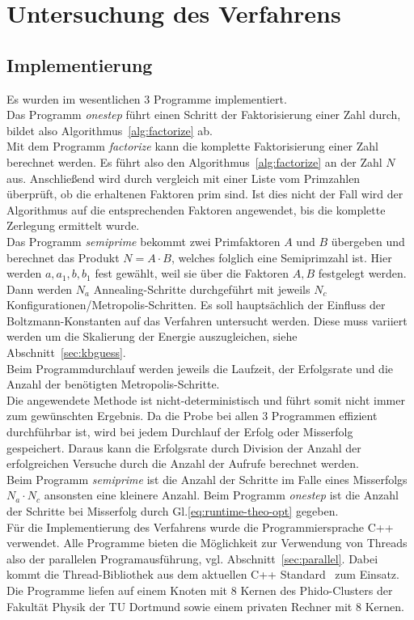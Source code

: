 \chapter{Untersuchung des Verfahrens}

\section{Implementierung}
Es wurden im wesentlichen $3$ Programme implementiert.  \\
Das Programm \textit{onestep} führt einen Schritt der Faktorisierung einer Zahl durch, bildet also Algorithmus~\ref{alg:factorize} ab. \\
Mit dem Programm \textit{factorize} kann die komplette Faktorisierung einer Zahl berechnet werden. Es führt also den Algorithmus~\ref{alg:factorize} an der Zahl $N$ aus. Anschließend wird durch vergleich mit einer Liste vom Primzahlen überprüft, ob die erhaltenen Faktoren prim sind. Ist dies nicht der Fall wird der Algorithmus auf die entsprechenden Faktoren angewendet, bis die komplette Zerlegung ermittelt wurde. \\
Das Programm \textit{semiprime} bekommt zwei Primfaktoren $A$ und $B$ übergeben und berechnet das Produkt $N=A\cdot B$, welches folglich eine Semiprimzahl ist. Hier werden $a, a_1, b, b_1$ fest gewählt, weil sie über die Faktoren $A,B$ festgelegt werden. Dann werden $N_a$ Annealing-Schritte durchgeführt mit jeweils $N_c$ Konfigurationen/Metropolis-Schritten. Es soll hauptsächlich der Einfluss der Boltzmann-Konstanten auf das Verfahren untersucht werden. Diese muss variiert werden um die Skalierung der Energie auszugleichen, siehe Abschnitt~\ref{sec:kbguess}. \\
Beim Programmdurchlauf werden jeweils die Laufzeit, der Erfolgsrate und die Anzahl der benötigten Metropolis-Schritte. \\
Die angewendete Methode ist nicht-deterministisch und führt somit nicht immer zum gewünschten Ergebnis. Da die Probe bei allen $3$ Programmen effizient durchführbar ist, wird bei jedem Durchlauf der Erfolg oder Misserfolg gespeichert. Daraus kann die Erfolgsrate durch Division der Anzahl der erfolgreichen Versuche durch die Anzahl der Aufrufe berechnet werden. \\
Beim Programm \textit{semiprime} ist die Anzahl der Schritte im Falle eines Misserfolgs $N_a\cdot N_c$ ansonsten eine kleinere Anzahl. Beim Programm \textit{onestep} ist die Anzahl der Schritte bei Misserfolg durch Gl.\eqref{eq:runtime-theo-opt} gegeben.\\
Für die Implementierung des Verfahrens wurde die Programmiersprache C++ verwendet. Alle Programme bieten die Möglichkeit zur Verwendung von Threads also der parallelen Programausführung, vgl. Abschnitt~\ref{sec:parallel}. Dabei kommt die Thread-Bibliothek aus dem aktuellen C++ Standard~\parencite{cppthreads} zum Einsatz. \\
Die Programme liefen auf einem Knoten mit $8$ Kernen des Phido-Clusters der Fakultät Physik der TU Dortmund sowie einem privaten Rechner mit $8$ Kernen.

